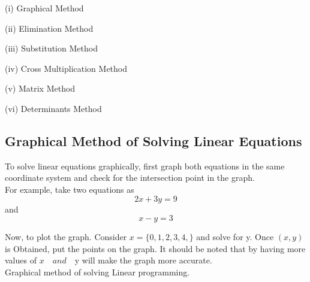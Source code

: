 \documentclass[a4paper, 12pt]{report}
\begin{document}
{      (i) Graphical Method
\

(ii) Elimination Method
\

        (iii) Substitution Method
\ 
 
        (iv) Cross Multiplication Method
\ 
 
        (v) Matrix Method
\ 
 
        (vi) Determinants Method\\
     
        
                 
    \subsection{Graphical Method of Solving Linear Equations}
        To solve linear equations graphically, first graph both equations in the same coordinate system and check for the intersection point in the graph.\\
        For example, take two equations as 
        \begin{equation}
        2x + 3y = 9
        \end{equation}
        and
        \begin{equation}
        x - y = 3
        \end{equation}
        
        Now, to plot the graph. Consider $x = \{0, 1, 2, 3, 4,\}$ and solve for y. Once $(x, y)$ is Obtained, put the points on the graph. It should be noted that by having more values of $x \quad and \quad $y will make the graph more accurate.\\
        
        Graphical method of solving Linear programming.\\
        \begin{center}
\end{center}}
\end{document}
